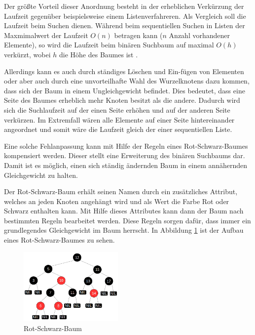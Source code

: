 Der größte Vorteil dieser Anordnung besteht in der erheblichen Verkürzung der Laufzeit gegenüber beispielsweise einem Listenverfahreren. 
Als Vergleich soll die Laufzeit beim Suchen dienen.
Während beim sequentiellen Suchen in Listen der Maxmimalwert der Laufzeit $O(n)$ betragen kann ($n$ Anzahl vorhandener Elemente), so wird die Laufzeit beim binären Suchbaum auf maximal $O(h)$ verkürzt, wobei $h$ die Höhe des Baumes ist \cite{tcormen}.

Allerdings kann es auch durch ständiges Löschen und Ein-fügen von Elementen oder aber auch durch eine unvorteilhafte Wahl des Wurzelknotens dazu kommen, dass sich der Baum in einem Ungleichgewicht befindet. Dies bedeutet, dass eine Seite des Baumes erheblich mehr Knoten besitzt als die andere. Dadurch wird sich die Suchlaufzeit auf der einen Seite erhöhen und auf der anderen Seite ver\-kürzen. Im Extremfall wären alle Elemente auf einer Seite hintereinander angeordnet und somit wäre die Laufzeit gleich der einer sequentiellen Liste.

Eine solche Fehlanpassung kann mit Hilfe der Regeln eines Rot-Schwarz-Baumes kompensiert werden. Dieser stellt eine Erweiterung des binären Suchbaums dar. Damit ist es möglich, einen sich ständig ändernden Baum in einem annähernden Gleichgewicht zu halten. 

Der Rot-Schwarz-Baum erhält seinen Namen durch ein zusätzliches At\-tri\-but, welches an jeden Knoten an\-ge\-hängt wird und als Wert die Farbe Rot oder Schwarz enthalten kann. 
Mit Hilfe dieses Attributes kann dann der Baum nach bestimmten Regeln bearbeitet werden. Diese Regeln sorgen dafür, dass immer ein grundlegendes Gleichgewicht im Baum herrscht. 
In Abbildung \ref{fig:rbtree} ist der Aufbau eines Rot-Schwarz-Baumes zu sehen.

\begin{figure}[h]
	\centering
	\includegraphics[width=0.45\textwidth]{pictures/redblacktree.png}
	\caption{Rot-Schwarz-Baum}
	\label{fig:rbtree}
\end{figure}

